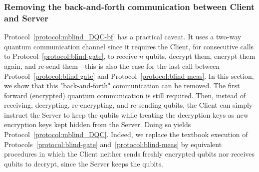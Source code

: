 \subsubsection{Removing the back-and-forth communication between Client and Server}
Protocol~\ref{protocol:mblind_DQC-bf} has a practical caveat. It uses a two-way quantum communication channel since it requires the Client, for consecutive calls to Protocol~\ref{protocol:blind-gate}, to receive $n$ qubits, decrypt them, encrypt them again, and re-send them---this is also the case for the last call between Protocol~\ref{protocol:blind-gate} and Protocol~\ref{protocol:blind-meas}. In this section, we show that this "back-and-forth" communication can be removed. The first forward (encrypted) quantum communication is still required. Then, instead of receiving, decrypting, re-encrypting, and re-sending qubits, the Client can simply instruct the Server to keep the qubits while treating the decryption keys as new encryption keys kept hidden from the Server. Doing so yields Protocol~\ref{protocol:mblind_DQC}. Indeed, we replace the textbook execution of Protocols~\ref{protocol:blind-gate} and~\ref{protocol:blind-meas} by equivalent procedures in which the Client neither sends freshly encrypted qubits nor receives qubits to decrypt, since the Server keeps the qubits.
